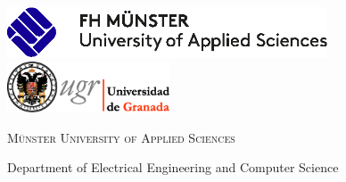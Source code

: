 
\begin{titlepage}
    \begin{addmargin}[-2cm]{-1.5cm}
    	\begin{center}
	        \large  
	
	        \hfill
	
	        \vfill
	        
	        \includegraphics[height=1.5cm]{Figures/Logo-FH-Muenster}
			\hfill
			\includegraphics[height=1.5cm]{Figures/universidad_de_granada} 

			\vfill
			
			{\Large \textsc{Münster University of Applied Sciences}}

			Department of Electrical Engineering and Computer Science
	        
	        \vfill
		
			\begin{minipage}{0.9 \textwidth}
				\begin{center}
			        \begingroup
			            \color{Maroon}\spacedallcaps{\myTitle} \\ \bigskip
			        \endgroup
		        \end{center}  
		    \end{minipage}
		    
		    \vspace{1cm}
		
	        \spacedlowsmallcaps{\myName}
	        
	        \vfill
	        
	        \begin{minipage}{0.9 \textwidth}
	        	\begin{center}
	        		\textit{\mySubtitle} \\
	        	\end{center}  
	        \end{minipage}

	        \vfill              
	        
	        \myTime   
	        
	        \vfill  
	        
		\end{center}  
	\end{addmargin}       
\end{titlepage}   
